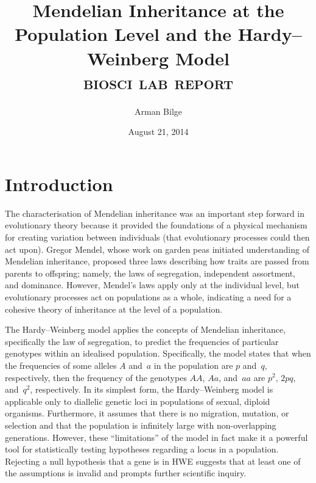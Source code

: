 \documentclass{article}
\title{Mendelian Inheritance at the Population Level and the Hardy--Weinberg
           Model \\
       \Large\textsc{biosci \oldstylenums{210} lab report}}
\author{Arman Bilge}
\date{August 21, 2014}
\begin{document}
    \maketitle

    \section*{Introduction}

        The characterisation of Mendelian inheritance was an important step
            forward in evolutionary theory because it provided the
            foundations of a physical mechanism for creating variation between
            individuals (that evolutionary processes could then act upon).
        Gregor Mendel, whose work on garden peas initiated understanding of
            Mendelian inheritance, proposed three laws describing how traits
            are passed from parents to offspring; namely, the laws of
            segregation, independent assortment, and dominance.
        However, Mendel's laws apply only at the individual level, but
            evolutionary processes act on populations as a whole, indicating a
            need for a cohesive theory of inheritance at the level of a
            population.

        The Hardy--Weinberg model applies the concepts of Mendelian
            inheritance, specifically the law of segregation, to predict the
            frequencies of particular genotypes within an idealised population.
        Specifically, the model states that when the frequencies of some
            alleles $A$ and~$a$ in the population are $p$ and~$q$,
            respectively, then the frequency of the genotypes $AA$, $Aa$,
            and~$aa$ are $p^2$, $2pq$, and~$q^2$, respectively.
        In its simplest form, the Hardy--Weinberg model is applicable only to
            diallelic genetic loci in populations of sexual, diploid organisms.
        Furthermore, it assumes that there is no migration, mutation, or
            selection and that the population is infinitely large with
            non-overlapping generations.
        However, these \enquote{limitations} of the model in fact make it a
            powerful tool for statistically testing hypotheses regarding a
            locus in a population.
        Rejecting a null hypothesis that a gene is in \ac{HWE} suggests that
            at least one of the assumptions is invalid and prompts further
            scientific inquiry.
\end{document}
